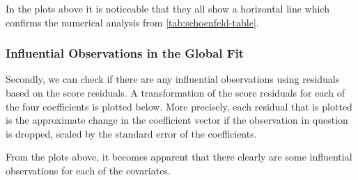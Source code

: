 \documentclass[
]{article}
\begin{document}
In the plots above it is noticeable that they all show a horizontal line which confirms the numerical analysis from \ref{tab:schoenfeld-table}.

\hypertarget{influential-observations-in-the-global-fit}{%
\subsubsection{Influential Observations in the Global Fit}\label{influential-observations-in-the-global-fit}}

Secondly, we can check if there are any influential observations using residuals based on the score residuals. A transformation of the score residuals for each of the four coefficients is plotted below. More precisely, each residual that is plotted is the approximate change in the coefficient vector if the observation in question is dropped, scaled by the standard error of the coefficients.

From the plots above, it becomes apparent that there clearly are some influential observations for each of the covariates.
\end{document}
